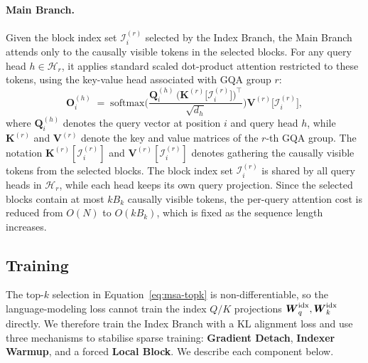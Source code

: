 \documentclass{llmxive}
\providecommand{\bm}[1]{\boldsymbol{#1}}
\providecommand{\softmax}{\mathrm{softmax}}
\providecommand{\Eqref}[1]{Equation~\ref{#1}}
\providecommand{\mK}{{\bm{K}}}
\providecommand{\mO}{{\bm{O}}}
\providecommand{\mQ}{{\bm{Q}}}
\providecommand{\mV}{{\bm{V}}}
\providecommand{\mW}{{\bm{W}}}
\providecommand{\gI}{{\mathcal{I}}}
\begin{document}
\paragraph{Main Branch.} Given the block index set $\gI_i^{(r)}$ selected by the Index Branch, the Main Branch attends only to the causally visible tokens in the selected blocks. For any query head $h \in \mathcal{H}_r$, it applies standard scaled dot-product attention restricted to these tokens, using the key-value head associated with GQA group $r$:
\begin{equation}
\label{eq:msa-sparse-attn}
\mO_{i}^{(h)}
\;=\;
\softmax\Biggl(
  \frac{\mQ_{i}^{(h)}\,
        \bigl(\mK^{(r)}\!\bigl[\gI_i^{(r)}\bigr]\bigr)^{\top}}
       {\sqrt{d_h}}
\Biggr)
\mV^{(r)}\!\bigl[\gI_i^{(r)}\bigr],
\end{equation}
where $\mQ_{i}^{(h)}$ denotes the query vector at position $i$ and query head $h$, while $\mK^{(r)}$ and $\mV^{(r)}$ denote the key and value matrices of the $r$-th GQA group.
The notation $\mK^{(r)}[\gI_i^{(r)}]$ and $\mV^{(r)}[\gI_i^{(r)}]$ denotes gathering the causally visible tokens from the selected blocks.
The block index set $\gI_i^{(r)}$ is shared by all query heads in $\mathcal{H}_r$, while each head keeps its own query projection. Since the selected blocks contain at most $kB_k$ causally visible tokens, the per-query attention cost is reduced from $O(N)$ to $O(kB_k)$, which is fixed as the sequence length increases.

\subsection{Training}
\label{sec:method-training}

The top-$k$ selection in \Eqref{eq:msa-topk} is non-differentiable, so the language-modeling loss cannot train the index $Q/K$ projections $\mW^{\rm idx}_q, \mW^{\rm idx}_k$ directly. We therefore train the Index Branch with a KL alignment loss and use three mechanisms to stabilise sparse training: \textbf{Gradient Detach}, \textbf{Indexer Warmup}, and a forced \textbf{Local Block}. We describe each component below.
\end{document}
